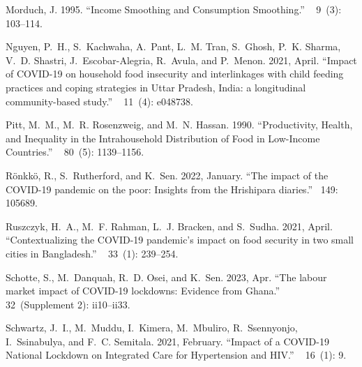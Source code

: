 \documentclass{wber}
\begin{document}
\begin{thebibliography}{}
Morduch, J. 1995.
\newblock ``Income {Smoothing} and {Consumption} {Smoothing}.''
~{ 9\/}~(3): 103--114.

Nguyen, P.~H., S.~Kachwaha, A.~Pant, L.~M. Tran, S.~Ghosh, P.~K. Sharma, V.~D.
  Shastri, J.~Escobar-Alegria, R.~Avula, and P.~Menon. 2021, April.
\newblock ``Impact of {COVID}-19 on household food insecurity and interlinkages
  with child feeding practices and coping strategies in {Uttar} {Pradesh},
  {India}: a longitudinal community-based study.''
~{ 11\/}~(4): e048738.

Pitt, M.~M., M.~R. Rosenzweig, and M.~N. Hassan. 1990.
\newblock ``{Productivity, Health, and Inequality in the Intrahousehold
  Distribution of Food in Low-Income Countries}.''
~{ 80\/}~(5): 1139--1156.

R{\"o}nkk{\"o}, R., S.~Rutherford, and K.~Sen. 2022, January.
\newblock ``The impact of the {COVID}-19 pandemic on the poor: {Insights} from
  the {Hrishipara} diaries.''
~{149}: 105689.

Ruszczyk, H.~A., M.~F. Rahman, L.~J. Bracken, and S.~Sudha. 2021, April.
\newblock ``Contextualizing the {COVID}-19 pandemic's impact on food security
  in two small cities in {Bangladesh}.''
~{ 33\/}~(1): 239--254.

Schotte, S., M.~Danquah, R.~D. Osei, and K.~Sen. 2023, Apr.
\newblock ``The labour market impact of {COVID-19} lockdowns: Evidence from
  {Ghana}.''
~{ 32\/}~(Supplement 2):
  ii10--ii33.

Schwartz, J.~I., M.~Muddu, I.~Kimera, M.~Mbuliro, R.~Ssennyonjo, I.~Ssinabulya,
  and F.~C. Semitala. 2021, February.
\newblock ``Impact of a {COVID}-19 {National} {Lockdown} on {Integrated} {Care}
  for {Hypertension} and {HIV}.''
~{ 16\/}~(1): 9.


\end{thebibliography}
\end{document}
